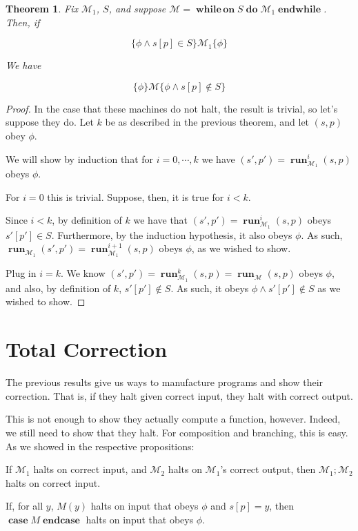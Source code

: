 \documentclass{article}
\newtheorem{theorem}{Theorem}
\newcommand{\M}{\mathcal{M}}
\DeclareMathOperator{\run}{\mathbf{run}}
\DeclareMathOperator{\Nwhileon}{\mathbf{while\,on}}
\DeclareMathOperator{\Ndo}{\mathbf{do}}
\DeclareMathOperator{\Nendwhile}{\mathbf{endwhile}}
\DeclareMathOperator{\Ncase}{\mathbf{case}}
\DeclareMathOperator{\Nendcase}{\mathbf{endcase}}
\begin{document}
	\begin{theorem}
	Fix $\M_1$, $S$, and suppose $\M = \Nwhileon S \Ndo \M_1 \Nendwhile$. Then, if
	
	\[\{\phi \land s[p] \in S\}\M_1\{\phi\}\]
	
	We have
	
	\[\{\phi\}\M\{\phi \land s[p] \not \in S\}\]
	\end{theorem}
	
	\begin{proof}
	In the case that these machines do not halt, the result is trivial, so let's suppose they do. Let $k$ be as described in the previous theorem, and let $(s,p)$ obey $\phi$.
	
	We will show by induction that for $i = 0, \cdots, k$ we have $(s', p') = \run_{\M_1}^i (s, p)$ obeys $\phi$.
	
	For $i = 0$ this is trivial. Suppose, then, it is true for $i < k$.
	
	Since $i < k$, by definition of $k$ we have that $(s', p') = \run_{\M_1}^i (s, p)$ obeys $s'[p'] \in S$. Furthermore, by the induction hypothesis, it also obeys $\phi$. As such, $\run_{\M_1}(s', p') = \run_{\M_1}^{i+1}(s,p)$ obeys $\phi$, as we wished to show.
	
	Plug in $i = k$. We know $(s', p') = \run_{\M_1}^k (s, p) = \run_\M(s,p)$ obeys $\phi$, and also, by definition of $k$, $s'[p'] \not \in S$. As such, it obeys $\phi \land s'[p'] \not \in S$ as we wished to show.
	\end{proof}
	
	\section{Total Correction}
	
	The previous results give us ways to manufacture programs and show their correction. That is, if they halt given correct input, they halt with correct output.
	
	This is not enough to show they actually compute a function, however. Indeed, we still need to show that they halt. For composition and branching, this is easy. As we showed in the respective propositions:
	
	If $\M_1$ halts on correct input, and $\M_2$ halts on $\M_1$'s correct output, then $\M_1;\M_2$ halts on correct input.
	
	If, for all $y$, $M(y)$ halts on input that obeys $\phi$ and $s[p] = y$, then $\Ncase M \Nendcase$ halts on input that obeys $\phi$.
	
\end{document}
